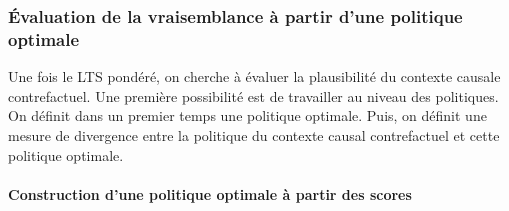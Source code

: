      

\subsubsection{Évaluation de la vraisemblance à partir d'une politique optimale} \label{v_pol_opt}
Une fois le LTS pondéré, on cherche à évaluer la plausibilité du contexte causale contrefactuel. Une première possibilité est de travailler au niveau des politiques. On définit dans un premier temps une politique optimale. Puis, on définit une mesure de divergence entre la politique du contexte causal contrefactuel et cette politique optimale.


 \paragraph{Construction d'une politique optimale à partir des scores}
\hfill

